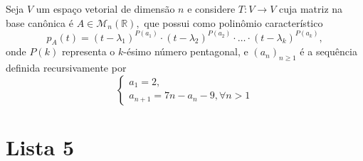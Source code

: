 \documentclass[11pt,a4paper]{article}
\begin{document}
 Seja $V$ um espaço vetorial de dimensão $n$ e considere $T \colon V \to V$ cuja matriz na base canônica é $A \in \mathcal{M}_n(\mathbb{R}),$ que possui como polinômio característico
\[
p_A(t) = (t - \lambda_1)^{P(a_1)} \cdot (t - \lambda_2)^{P(a_2)} \cdot \ldots \cdot (t - \lambda_k)^{P(a_k)},
\]
onde $P(k)$ representa o $k$-ésimo número pentagonal, e $(a_n)_{n \ge 1}$ é a sequência definida recursivamente por
\[\begin{cases}
a_1 = 2,\\
a_{n+1} = 7n - a_{n} - 9, \forall n > 1
\end{cases}\]
\solucao{}
\newpage
\section{\textcolor{Floresta}{Lista 5}}
\end{document}
